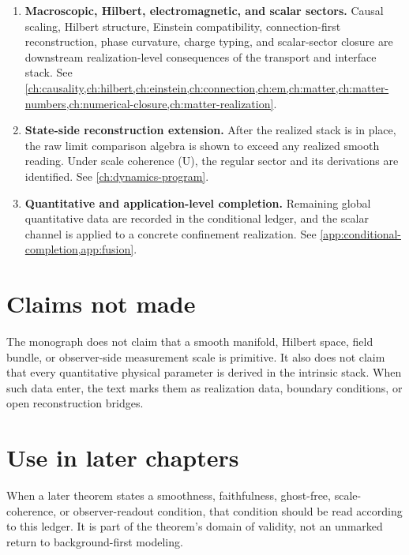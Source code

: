 \begin{enumerate}[label=\textup{(\arabic*)}]
\item \textbf{Macroscopic, Hilbert, electromagnetic, and scalar sectors.}
Causal scaling, Hilbert structure, Einstein compatibility,
connection-first reconstruction, phase curvature, charge typing, and
scalar-sector closure are downstream realization-level consequences of
the transport and interface stack.  See
\cref{ch:causality,ch:hilbert,ch:einstein,ch:connection,ch:em,ch:matter,ch:matter-numbers,ch:numerical-closure,ch:matter-realization}.

\item \textbf{State-side reconstruction extension.}
After the realized stack is in place, the raw limit comparison algebra is
shown to exceed any realized smooth reading.  Under scale coherence
\textup{(U)}, the regular sector and its derivations are identified.  See
\cref{ch:dynamics-program}.

\item \textbf{Quantitative and application-level completion.}
Remaining global quantitative data are recorded in the conditional
ledger, and the scalar channel is applied to a concrete confinement
realization.  See \cref{app:conditional-completion,app:fusion}.
\end{enumerate}

\section*{Claims not made}
The monograph does not claim that a smooth manifold, Hilbert space,
field bundle, or observer-side measurement scale is primitive.  It also
does not claim that every quantitative physical parameter is derived in
the intrinsic stack.  When such data enter, the text marks them as
realization data, boundary conditions, or open reconstruction bridges.

\section*{Use in later chapters}
When a later theorem states a smoothness, faithfulness, ghost-free,
scale-coherence, or observer-readout condition, that condition should be
read according to this ledger.  It is part of the theorem's domain of
validity, not an unmarked return to background-first modeling.
